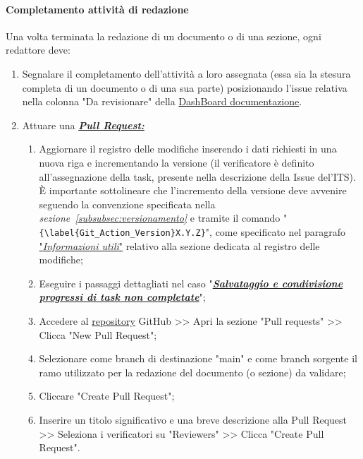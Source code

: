 \paragraph*{\textbf{Completamento attività di redazione}}
Una volta terminata la redazione di un documento o di una sezione, ogni redattore deve:
\begin{enumerate}
    \item Segnalare il completamento dell'attività a loro assegnata (essa sia la stesura completa di un documento o di una sua parte) posizionando l'issue relativa nella colonna "Da revisionare" della \href{https://github.com/orgs/ByteOps-swe/projects/1/views/1}{DashBoard documentazione}.
    \item Attuare una \hyperlink{par:creazionePR}{\textit{\textbf{Pull Request:}}}
          \begin{enumerate}
              \item Aggiornare il registro delle modifiche inserendo i dati richiesti in una nuova riga e incrementando la versione (il verificatore è definito all'assegnazione della task, presente nella descrizione della Issue del'ITS).
              È importante sottolineare che l'incremento della versione deve avvenire seguendo la convenzione specificata nella \textit{sezione~\ref{subsubsec:versionamento}} e tramite il comando "\verb|{\label{Git_Action_Version}X.Y.Z}|", come specificato nel paragrafo \hyperlink{par:infoUtiliRegistroMod}{"\textit{Informazioni utili}"} relativo alla sezione dedicata al registro delle modifiche;
              \item Eseguire i passaggi dettagliati nel caso "\hyperlink{par:salvataggioecondivisioneprogressitasknoncompletate}{\textit{\textbf{Salvataggio e condivisione progressi di task non completate}}}";
              \item Accedere al \href{https://github.com/ByteOps-swe/Sorgente-documenti.git}{repository} GitHub >> Apri la sezione "Pull requests" >> Clicca "New Pull Request";
              \item Selezionare come branch di destinazione "main" e come branch sorgente il ramo utilizzato per la redazione del documento (o sezione) da validare;
              \item Cliccare "Create Pull Request";
              \item Inserire un titolo significativo e una breve descrizione alla Pull Request >> Seleziona i verificatori su "Reviewers" >> Clicca "Create Pull Request".
          \end{enumerate}
\end{enumerate}

